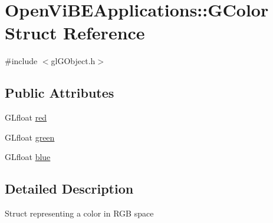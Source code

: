 \hypertarget{structOpenViBEApplications_1_1GColor}{
\section{OpenViBEApplications::GColor Struct Reference}
\label{structOpenViBEApplications_1_1GColor}
}


{\ttfamily \#include $<$glGObject.h$>$}

\subsection*{Public Attributes}
\begin{DoxyCompactItemize}
\item 
GLfloat \hyperlink{structOpenViBEApplications_1_1GColor_a5b1ea4c587174b82ab5a5d9697609a47}{red}
\item 
GLfloat \hyperlink{structOpenViBEApplications_1_1GColor_a1a23576e675d0d23c46fa0eac403f895}{green}
\item 
GLfloat \hyperlink{structOpenViBEApplications_1_1GColor_a0c7f93a7f846297b0a9562ec847af43f}{blue}
\end{DoxyCompactItemize}


\subsection{Detailed Description}
Struct representing a color in RGB space 

